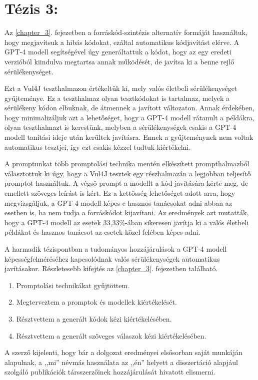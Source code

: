 \section*{Tézis 3: \thesispointthreehu}

Az \ref{chapter_3}. fejezetben a forráskód-szintézis alternatív formáját használtuk, hogy megjavítsuk a hibás kódokat, ezáltal automatikus kódjavítást elérve.
A GPT-4 mo\-dell segítségével úgy generáltattuk a kódot, hogy az egy eredeti verzióból kiindulva megtartsa annak működését, de javítsa ki a benne rejlő sérülékenységet.

Ezt a Vul4J teszthalmazon értékeltük ki, mely valós életbeli sérülékenységet gyűj\-te\-mé\-nye.
Ez a teszthalmaz olyan tesztkódokat is tartalmaz, melyek a sérülékeny kódon elbuknak, de átmennek a javított változaton.
Annak érdekében, hogy minimalizáljuk azt a lehetőséget, hogy a GPT-4 modell rátanult a példákra, olyan teszthalmazt is kerestünk, melyben a sérülékenységek csakis a GPT-4 modell tanítási ideje után kerültek javításra.
Ennek a gyűjteménynek nem voltak automatikus tesztjei, így ezt csakis kézzel tudtuk kiértékelni.

A promptunkat több promptolási technika mentén elkészített prompthalmazból választottuk ki úgy, hogy a Vul4J tesztek egy részhalmazán a legjobban teljesítő promptot használtuk.
A végső prompt a modellt a kód javítására kérte meg, de emellett szöveges leírást is kért.
Ez a kettősség lehetőséget adott arra, hogy megvizsgáljuk, a GPT-4 modell képes-e hasznos tanácsokat adni abban az esetben is, ha nem tudja a forráskódot kijavítani.
Az eredmények azt mutatták, hogy a GPT-4 modell az esetek 33,33\%-ában sikeresen javítja ki a valós életbeli példákat és hasznos tanácsot az esetek közel felében képes adni.

\vspace{1cm}

\noindent
A harmadik tézispontban a tudományos hozzájárulások a GPT-4 modell ké\-pes\-ség\-fel\-mé\-ré\-sé\-hez kapcsolódnak valós sérülékenységek automatikus javításakor.
Részletesebb kifejtés az \ref{chapter_3}. fejezetben található.

\begin{enumerate}[wide = 0pt, widest = {III/5.}, leftmargin =*]
	
	\item[III/1.] Promptolási technikákat gyűjtöttem.
	
	\item[III/2.] Megterveztem a promptok és modellek kiértékelését.
	
	\item[III/3.] Résztvettem a generált kódok kézi kiértékelésében.
	
	\item[III/4.] Résztvettem a generált szöveges válaszok kézi kiértékelésében.
	
\end{enumerate}

A szerző kijelenti, hogy bár a dolgozat eredményei elsősorban saját mun\-ká\-ján alapulnak, a ,,mi'' névmás használata az ,,én'' helyett a disszertáció alapjául szolgáló publikációk társszerzőinek hozzájárulását hivatott elismerni.

